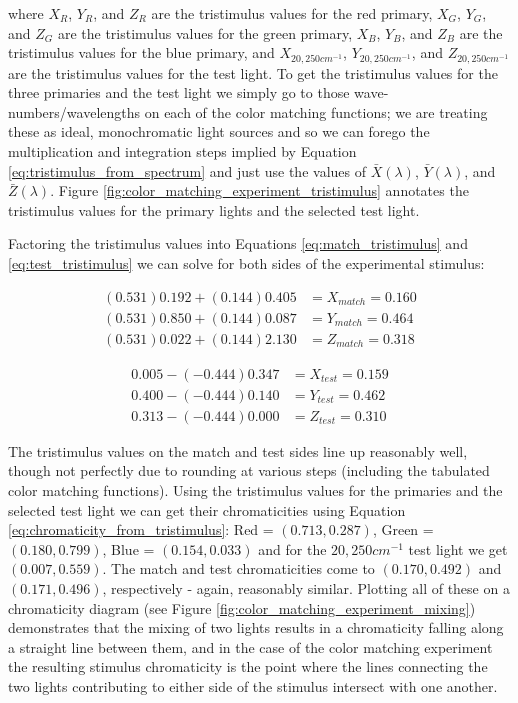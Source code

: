 \documentclass{article}
\begin{document}
\begin{multicols}{2}
where $X_R$, $Y_R$, and $Z_R$ are the tristimulus values for the red primary, $X_G$, $Y_G$, and $Z_G$ are the tristimulus values for the green primary, $X_B$, $Y_B$, and $Z_B$ are the tristimulus values for the blue primary, and $X_{20,250cm^{-1}}$, $Y_{20,250cm^{-1}}$, and $Z_{20,250cm^{-1}}$ are the tristimulus values for the test light.  To get the tristimulus values for the three primaries and the test light we simply go to those wave-numbers/wavelengths on each of the color matching functions; we are treating these as ideal, monochromatic light sources and so we can forego the multiplication and integration steps implied by Equation \ref{eq:tristimulus_from_spectrum} and just use the values of $\bar{X}(\lambda)$, $\bar{Y}(\lambda)$, and $\bar{Z}(\lambda)$.  Figure \ref{fig:color_matching_experiment_tristimulus} annotates the tristimulus values for the primary lights and the selected test light.

Factoring the tristimulus values into Equations \ref{eq:match_tristimulus} and \ref{eq:test_tristimulus} we can solve for both sides of the experimental stimulus:

\begin{equation} %
    \begin{aligned}
        (0.531)0.192+(0.144)0.405&=X_{match}=0.160\\
        (0.531)0.850+(0.144)0.087&=Y_{match}=0.464\\
        (0.531)0.022+(0.144)2.130&=Z_{match}=0.318
    \end{aligned}
\end{equation}

\begin{equation} %
    \begin{aligned}
        0.005-(-0.444)0.347&=X_{test}=0.159\\
        0.400-(-0.444)0.140&=Y_{test}=0.462\\
        0.313-(-0.444)0.000&=Z_{test}=0.310
    \end{aligned}
\end{equation}

The tristimulus values on the match and test sides line up reasonably well, though not perfectly due to rounding at various steps (including the tabulated color matching functions).  Using the tristimulus values for the primaries and the selected test light we can get their chromaticities using Equation \ref{eq:chromaticity_from_tristimulus}: Red = $(0.713,0.287)$, Green = $(0.180,0.799)$, Blue = $(0.154,0.033)$ and for the $20,250cm^{-1}$ test light we get $(0.007,0.559)$.  The match and test chromaticities come to $(0.170,0.492)$ and $(0.171,0.496)$, respectively - again, reasonably similar.  Plotting all of these on a chromaticity diagram (see Figure \ref{fig:color_matching_experiment_mixing}) demonstrates that the mixing of two lights results in a chromaticity falling along a straight line between them, and in the case of the color matching experiment the resulting stimulus chromaticity is the point where the lines connecting the two lights contributing to either side of the stimulus intersect with one another.


\end{multicols}
\end{document}
